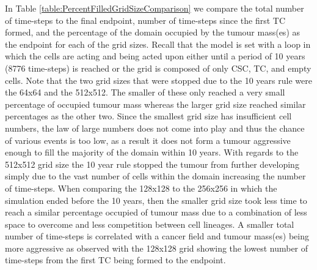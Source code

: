 \documentclass[\main/thesis.tex]{subfiles}
\begin{document}
In Table \ref{table:PercentFilledGridSizeComparison} we compare the total number of time-steps to the final endpoint, number of time-steps since the first TC formed, and the percentage of the domain occupied by the tumour mass(es) as the endpoint for each of the grid sizes. Recall that the model is set with a loop in which the cells are acting and being acted upon either until a period of 10 years (8776 time-steps) is reached or the grid is composed of only CSC, TC, and empty cells. Note that the two grid sizes that were stopped due to the 10 years rule were the 64x64 and the 512x512. The smaller of these only reached a very small percentage of occupied tumour mass whereas the larger grid size reached similar percentages as the other two. Since the smallest grid size has insufficient cell numbers, the law of large numbers does not come into play and thus the chance of various events is too low, as a result it does not form a tumour aggressive enough to fill the majority of the domain within 10 years. With regards to the 512x512 grid size the 10 year rule stopped the tumour from further developing simply due to the vast number of cells within the domain increasing the number of time-steps. When comparing the 128x128 to the 256x256 in which the simulation ended before the 10 years, then the smaller grid size took less time to reach a similar percentage occupied of tumour mass due to a combination of less space to overcome and less competition between cell lineages. A smaller total number of time-steps is correlated with a cancer field and tumour mass(es) being more aggressive as observed with the 128x128 grid showing the lowest number of time-steps from the first TC being formed to the endpoint.
\begin{table}[H]
\centering
{}
\caption{This table compares the total number of time-steps, number of time-steps since the first TC formed, and the percentage the tumour mass(es) make up of the domain at the end of the simulation between all the grid sizes.}
\label{table:PercentFilledGridSizeComparison} 
\end{table}
\end{document}
